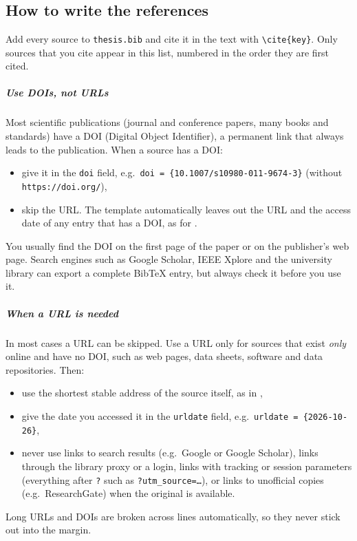 \chapter*{\bibname}
\label{chap:bibliography}
\begin{instructions}
\section*{How to write the references}
Add every source to \texttt{thesis.bib} and cite it in the text with \texttt{\textbackslash cite\{key\}}. Only sources that you cite appear in this list, numbered in the order they are first cited.

\paragraph{Use DOIs, not URLs}
Most scientific publications (journal and conference papers, many books and standards) have a DOI (Digital Object Identifier), a permanent link that always leads to the publication. When a source has a DOI:
\begin{itemize}
    \item give it in the \texttt{doi} field, e.g.\ \texttt{doi = \{10.1007/s10980-011-9674-3\}} (without \texttt{https://doi.org/}),
    \item skip the URL. The template automatically leaves out the URL and the access date of any entry that has a DOI, as for \cite{wu2011}.
\end{itemize}
You usually find the DOI on the first page of the paper or on the publisher's web page. Search engines such as Google Scholar, IEEE Xplore and the university library can export a complete BibTeX entry, but always check it before you use it.

\paragraph{When a URL is needed}
In most cases a URL can be skipped. Use a URL only for sources that exist \emph{only} online and have no DOI, such as web pages, data sheets, software and data repositories. Then:
\begin{itemize}
    \item use the shortest stable address of the source itself, as in \cite{overleafbiblatex},
    \item give the date you accessed it in the \texttt{urldate} field, e.g.\ \texttt{urldate = \{2026-10-26\}},
    \item never use links to search results (e.g.\ Google or Google Scholar), links through the library proxy or a login, links with tracking or session parameters (everything after \texttt{?} such as \texttt{?utm\_source=\ldots}), or links to unofficial copies (e.g.\ ResearchGate) when the original is available.
\end{itemize}
Long URLs and DOIs are broken across lines automatically, so they never stick out into the margin.


\end{instructions}
